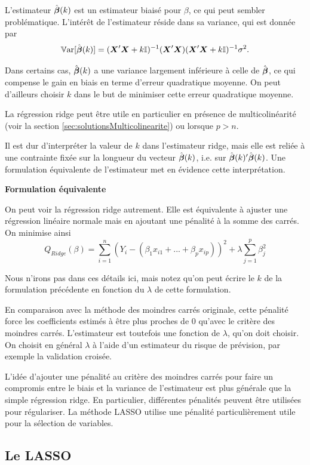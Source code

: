 L'estimateur $\hat{\mbox{\boldmath$\beta$}}(k)$ est un estimateur biaisé pour $\beta$, ce qui peut sembler problématique. L'intérêt de l'estimateur réside dans sa variance, qui est donnée par
$$\mathbb{V}\text{ar}[\hat{\mbox{\boldmath$\beta$}}(k)]=(\mbox{\boldmath$X$\unboldmath}'\mbox{\boldmath$X$\unboldmath}+k\mbox{\boldmath$\mathbb{I}$\unboldmath})^{-1}(\mbox{\boldmath$X$\unboldmath}'\mbox{\boldmath$X$\unboldmath})(\mbox{\boldmath$X$\unboldmath}'\mbox{\boldmath$X$\unboldmath}+k\mbox{\boldmath$\mathbb{I}$\unboldmath})^{-1}\sigma^2.$$


Dans certains cas, $\hat{\mbox{\boldmath$\beta$}}(k)$ a une variance largement inférieure à celle de $\hat{\mbox{\boldmath$\beta$}}$, ce qui compense le gain en biais en terme d'erreur quadratique moyenne. On peut d'ailleurs choisir $k$ dans le but de minimiser cette erreur quadratique moyenne.

La régression ridge peut être utile en particulier en présence de multicolinéarité (voir la section \ref{sec:solutionsMulticolinearite}) ou lorsque $p>n$.

Il est dur d'interpréter la valeur de $k$ dans l'estimateur ridge, mais elle est reliée à une contrainte fixée sur la longueur du vecteur $\hat{\mbox{\boldmath$\beta$}}(k)$, i.e. sur $\hat{\mbox{\boldmath$\beta$}}(k)'\hat{\mbox{\boldmath$\beta$}}(k)$. Une formulation équivalente de l'estimateur met en évidence cette interprétation.

\newpage

\textbf{Formulation équivalente}

On peut voir la régression ridge autrement. Elle est équivalente à ajuster une régression linéaire normale mais en ajoutant une pénalité à la somme des carrés. On minimise ainsi
$$ Q_{Ridge}(\beta) = \sum_{i=1}^n (Y_i - (\beta_1x_{i1}+...+\beta_px_{ip}))^2 + \lambda \sum_{j=1}^p \beta_j^2 $$

Nous n'irons pas dans ces détails ici, mais notez qu'on peut écrire le $k$ de la formulation précédente en fonction du $\lambda$ de cette formulation.

En comparaison avec la méthode des moindres carrés originale, cette pénalité force les coefficients estimés à être plus proches de 0 qu'avec le critère des moindres carrés. L'estimateur est toutefois une fonction de $\lambda$, qu'on doit choisir. On choisit en général $\lambda$ à l'aide d'un estimateur du risque de prévision, par exemple la validation croisée.

L'idée d'ajouter une pénalité au critère des moindres carrés pour faire un compromis entre le biais et la variance de l'estimateur est plus générale que la simple régression ridge. En particulier, différentes pénalités peuvent être utilisées pour régulariser. La méthode LASSO utilise une pénalité particulièrement utile pour la sélection de variables.

\subsection{Le LASSO}
\label{sub:lasso}

